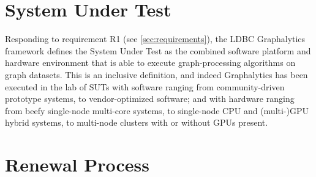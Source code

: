 










\section{System Under Test} \label{sec:sut}

Responding to requirement R1 (see \autoref{sec:requirements}), the LDBC Graphalytics framework defines the System Under Test as the combined software platform and hardware environment that is able to execute graph-processing algorithms on graph datasets. This is an inclusive definition, and indeed Graphalytics has been executed in the lab of SUTs with software ranging from community-driven prototype systems, to vendor-optimized software; and with hardware ranging from beefy single-node multi-core systems, to single-node CPU and (multi-)GPU hybrid systems, to multi-node clusters with or without GPUs present. 


\section{Renewal Process} \label{sec:renewal}

